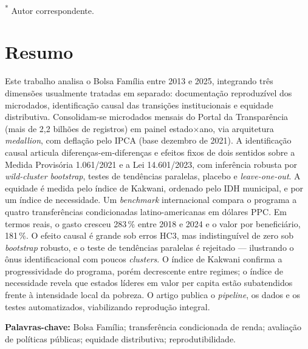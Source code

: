 \documentclass[12pt,a4paper,oneside]{article}
\begin{document}
\begin{center}{\footnotesize\textsuperscript{*} Autor correspondente.\par}\end{center}

\vspace{6pt}


\section*{Resumo}
\begin{singlespace}\small\noindent
Este trabalho analisa o Bolsa Família entre 2013 e 2025, integrando três dimensões usualmente tratadas em separado: documentação reproduzível dos microdados, identificação causal das transições institucionais e equidade distributiva. Consolidam-se microdados mensais do Portal da Transparência (mais de 2,2 bilhões de registros) em painel estado$\times$ano, via arquitetura \textit{medallion}, com deflação pelo IPCA (base dezembro de 2021). A identificação causal articula diferenças-em-diferenças e efeitos fixos de dois sentidos sobre a Medida Provisória 1.061/2021 e a Lei 14.601/2023, com inferência robusta por \textit{wild-cluster bootstrap}, testes de tendências paralelas, placebo e \textit{leave-one-out}. A equidade é medida pelo índice de Kakwani, ordenado pelo IDH municipal, e por um índice de necessidade. Um \textit{benchmark} internacional compara o programa a quatro transferências condicionadas latino-americanas em dólares PPC. Em termos reais, o gasto cresceu 283\,\% entre 2018 e 2024 e o valor por beneficiário, 181\,\%. O efeito causal é grande sob erros HC3, mas indistinguível de zero sob \textit{bootstrap} robusto, e o teste de tendências paralelas é rejeitado --- ilustrando o ônus identificacional com poucos \textit{clusters}. O índice de Kakwani confirma a progressividade do programa, porém decrescente entre regimes; o índice de necessidade revela que estados líderes em valor per capita estão subatendidos frente à intensidade local da pobreza. O artigo publica o \textit{pipeline}, os dados e os testes automatizados, viabilizando reprodução integral.

\vspace{6pt}\noindent\textbf{Palavras-chave:} Bolsa Família; transferência condicionada de renda; avaliação de políticas públicas; equidade distributiva; reprodutibilidade.
\end{singlespace}
\end{document}
